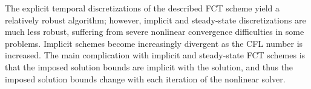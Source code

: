 The explicit temporal discretizations of the described FCT scheme yield a
relatively robust algorithm; however, implicit and steady-state discretizations
are much less robust, suffering from severe nonlinear convergence difficulties
in some problems. Implicit schemes become increasingly divergent as the CFL
number is increased. The main complication with implicit and steady-state
FCT schemes is that the imposed solution bounds are implicit with the solution,
and thus the imposed solution bounds change with each iteration of the
nonlinear solver.

